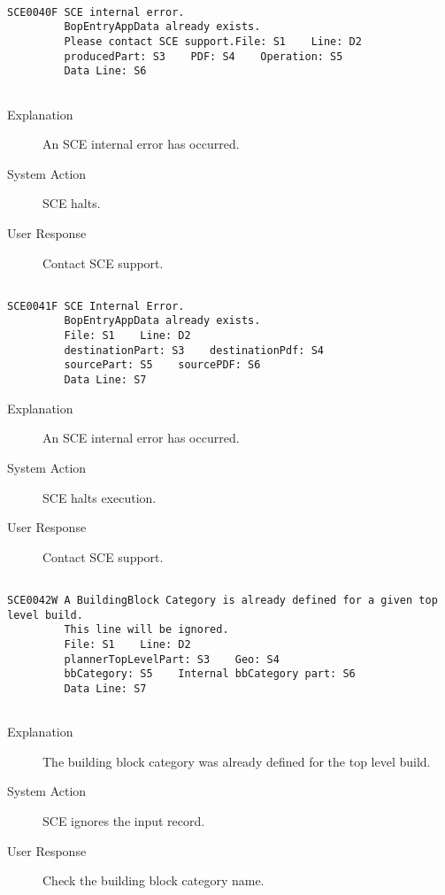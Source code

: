 \hrulefill
\begin{verbatim}

SCE0040F SCE internal error.
         BopEntryAppData already exists.
         Please contact SCE support.File: S1    Line: D2
         producedPart: S3    PDF: S4    Operation: S5
         Data Line: S6
         
\end{verbatim}
\begin{description}
\item[Explanation]  An SCE internal error has occurred.

\item[System Action]  SCE halts.

\item[User Response]  Contact SCE support.
\end{description}
\hrulefill
\begin{verbatim}

SCE0041F SCE Internal Error.
         BopEntryAppData already exists.
         File: S1    Line: D2
         destinationPart: S3    destinationPdf: S4
         sourcePart: S5    sourcePDF: S6
         Data Line: S7
\end{verbatim}
\begin{description}
\item[Explanation]  An SCE internal error has occurred.

\item[System Action]  SCE halts execution.

\item[User Response]  Contact SCE support.
\end{description}
\hrulefill
\begin{verbatim}

SCE0042W A BuildingBlock Category is already defined for a given top level build.
         This line will be ignored.
         File: S1    Line: D2
         plannerTopLevelPart: S3    Geo: S4
         bbCategory: S5    Internal bbCategory part: S6
         Data Line: S7
         
\end{verbatim}
\begin{description}
\item[Explanation]  The building block category was already defined for the top level build.

\item[System Action]  SCE ignores the input record.

\item[User Response]  Check the building block category name.
\end{description}
